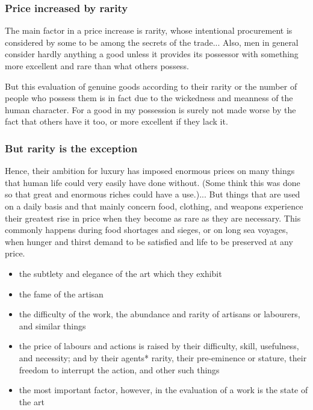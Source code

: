         \subsubsection{Price increased by rarity}

            The main factor in a price increase is rarity, whose intentional procurement is considered by some to be among the secrets of the trade... Also, men in general consider hardly anything a good unless it provides its possessor with something more excellent and rare than what others possess.
            
            But this evaluation of genuine goods according to their rarity or the number of people who possess them is in fact due to the wickedness and meanness of the human character. For a good in my possession is surely not made worse by the fact that others have it too, or more excellent if they lack it.

        \subsubsection{But rarity is the exception}

            Hence, their ambition for luxury has imposed enormous prices on many things that human life could very easily have done without. (Some think this was done so that great and enormous riches could have a use.)... But things that are used on a daily basis and that mainly concern food, clothing, and weapons experience their greatest rise in price when they become as rare as they are necessary. This commonly happens during food shortages and sieges, or on long sea voyages, when hunger and thirst demand to be satisfied and life to be preserved at any price.

            \begin{remark}
            
                \begin{itemize}
                    \item the subtlety and elegance of the art which they exhibit
                    \item the fame of the artisan
                    \item the difficulty of the work, the abundance and rarity of artisans or labourers, and similar things
                    \item the price of labours and actions is raised by their difficulty, skill, usefulness, and necessity; and by their agents* rarity, their pre-eminence or stature, their freedom to interrupt the action, and other such things
                    \item the most important factor, however, in the evaluation of a work is the state of the art
                \end{itemize}
            \end{remark}

